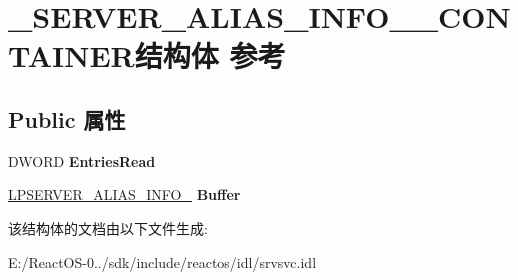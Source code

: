 \hypertarget{struct___s_e_r_v_e_r___a_l_i_a_s___i_n_f_o__0___c_o_n_t_a_i_n_e_r}{}\section{\+\_\+\+S\+E\+R\+V\+E\+R\+\_\+\+A\+L\+I\+A\+S\+\_\+\+I\+N\+F\+O\+\_\+\_\+\+C\+O\+N\+T\+A\+I\+N\+E\+R结构体 参考}
\label{struct___s_e_r_v_e_r___a_l_i_a_s___i_n_f_o__0___c_o_n_t_a_i_n_e_r}
\subsection*{Public 属性}
\begin{DoxyCompactItemize}
\item 
\mbox{\label{struct___s_e_r_v_e_r___a_l_i_a_s___i_n_f_o__0___c_o_n_t_a_i_n_e_r_a1a4e0de513d756efb595d5b6d0014557}} 
D\+W\+O\+RD {\bfseries Entries\+Read}
\item 
\mbox{\label{struct___s_e_r_v_e_r___a_l_i_a_s___i_n_f_o__0___c_o_n_t_a_i_n_e_r_a1a3095224f110128442a60d170ec2229}} 
\hyperlink{struct___s_e_r_v_e_r___a_l_i_a_s___i_n_f_o__0}{L\+P\+S\+E\+R\+V\+E\+R\+\_\+\+A\+L\+I\+A\+S\+\_\+\+I\+N\+F\+O\+\_} {\bfseries Buffer}
\end{DoxyCompactItemize}


该结构体的文档由以下文件生成\+:\begin{DoxyCompactItemize}
\item 
E\+:/\+React\+O\+S-\/0../sdk/include/reactos/idl/srvsvc.\+idl\end{DoxyCompactItemize}
